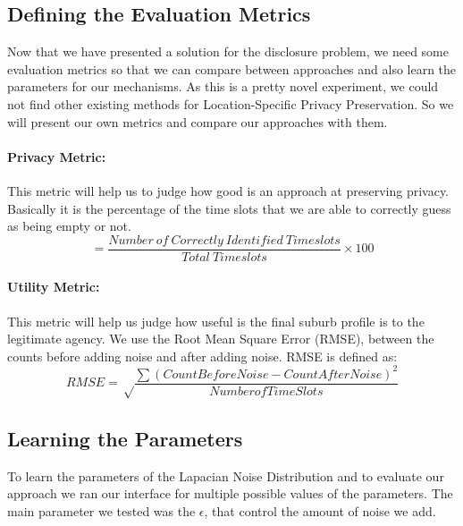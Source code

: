 \documentclass[12pt]{report}
\theoremstyle{named}
\begin{document}
\subsection{Defining the Evaluation Metrics}
Now that we have presented a solution for the disclosure problem, we need some evaluation metrics so that we can compare between approaches and also learn the parameters for our mechanisms. As this is a pretty novel experiment, we could not find other existing methods for Location-Specific Privacy Preservation. So we will present our own metrics and compare our approaches with them.

\paragraph{\textbf{Privacy Metric:}} This metric will help us to judge how good is an approach at preserving privacy. Basically it is the percentage of the time slots that we are able to correctly guess as being empty or not.
\[=\frac{Number\ of\ Correctly\ Identified\ Timeslots}{Total\ Timeslots} \times 100\]
\paragraph{\textbf{Utility Metric:}} This metric will help us judge how useful is the final suburb profile is to the legitimate agency. We use the Root Mean Square Error (RMSE), between the counts before adding noise and after adding noise. RMSE is defined as:
\[RMSE = \sqrt\frac{\sum (CountBefore Noise - CountAfterNoise)^{2}}{Number of TimeSlots}\]


\subsection{Learning the Parameters}
To learn the parameters of the Lapacian Noise Distribution and to evaluate our approach we ran our interface for multiple possible values of the parameters. The main parameter we tested was the $\epsilon$, that control the amount of noise we add.
\end{document}
